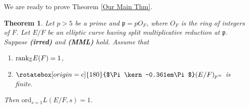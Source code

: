 \documentclass[reqno,10pt]{amsart}
\newcommand{\z}{\mathbb{Z}}
\newcommand{\p}{\mathfrak{p}}
\newcommand{\Varpi}{\rotatebox[origin=c]{180}{$\Pi\kern-0.361em\Pi$}}
\theoremstyle{plain}
\newtheorem{thm}{Theorem}[section]
\theoremstyle{definition}
\begin{document}
We are ready to prove Theorem \ref{Our Main Thm}.

\begin{thm} \label{main theorem in text}
    Let $p > 5$ be a prime and $\p = pO_F$, where $O_F$ is the ring of integers of $F$. Let $E/F$ be an elliptic curve having split multiplicative reduction at $\p$. Suppose \textbf{(irred)} and \textbf{(MML)} hold. Assume that
    \begin{enumerate}
        \item $\mathrm{rank}_\z \hspace{0.1mm} E(F) = 1$,
        \item $\Varpi(E/F)_{p^\infty}$ is finite.
    \end{enumerate}
    Then $\mathrm{ord}_{s=1} L(E/F,s) = 1$.
\end{thm}
\end{document}
